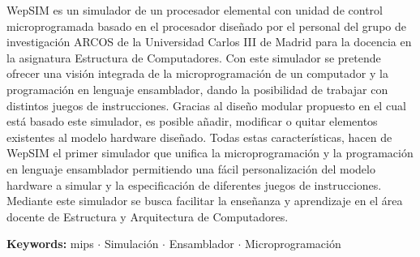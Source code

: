 % 
% 
%
\thispagestyle{plain}

WepSIM es un simulador de un procesador elemental con unidad de control microprogramada basado en el procesador diseñado por el personal del grupo de investigación ARCOS de la Universidad Carlos III de Madrid para la docencia en la asignatura Estructura de Computadores. Con este simulador se pretende ofrecer una visión integrada de la microprogramación de un computador y la programación en lenguaje ensamblador, dando la posibilidad de trabajar con distintos juegos de instrucciones. Gracias al diseño modular propuesto en el cual está basado este simulador, es posible añadir, modificar o quitar elementos existentes al modelo hardware diseñado. Todas estas características, hacen de WepSIM el primer simulador que unifica la microprogramación y la programación en lenguaje ensamblador permitiendo una fácil personalización del modelo hardware a simular y la especificación de diferentes juegos de instrucciones. Mediante este simulador se busca facilitar la enseñanza y aprendizaje en el área docente de Estructura y Arquitectura de Computadores.
\vspace{0.7cm}

\textbf{Keywords:} \acrshort{mips} $\cdot$ Simulación $\cdot$ Ensamblador $\cdot$ Microprogramación
